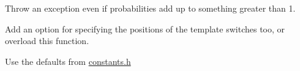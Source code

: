 \begin{DoxyRefList}
Throw an exception even if probabilities add up to something greater than 1.  
\item[\label{todo__todo000010}%
\Hypertarget{todo__todo000010}%
Member \mbox{\hyperlink{classrcombinator_1_1Sequence_a976b331689ec55d9d306281bbff5d22d}{rcombinator\+:\+:Sequence\+:\+:Sequence}} (\mbox{\hyperlink{classrcombinator_1_1Sequence}{Sequence}} \&s1, \mbox{\hyperlink{classrcombinator_1_1Sequence}{Sequence}} \&s2, int num\+\_\+template\+\_\+switches)]Add an option for specifying the positions of the template switches too, or overload this function.  
\item[\label{todo__todo000003}%
\Hypertarget{todo__todo000003}%
Member \mbox{\hyperlink{classrcombinator_1_1T93Model_ad975a4779689bb7ea958be8d956c31ed}{rcombinator\+:\+:T93\+Model\+:\+:T93\+Model}} (double pi\+\_\+T=0.\+25, double pi\+\_\+C=0.\+25, double pi\+\_\+A=0.\+25, double pi\+\_\+G=0.\+25, double k1=0.\+1, double k2=0.\+1, double scale=0.\+25)]Use the defaults from \mbox{\hyperlink{constants_8h}{constants.\+h}} 
\end{DoxyRefList}
